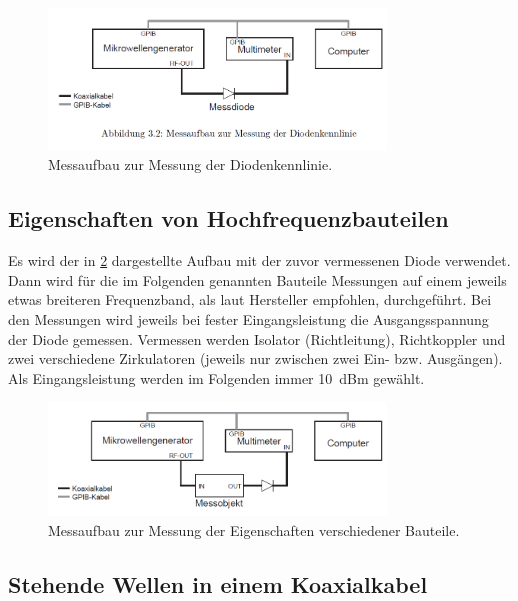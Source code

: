 \documentclass[
	a4paper,
	12pt,
	pagesize,
	ngerman
]{scrartcl}
\begin{document}
	\begin{figure}[H]
		\includegraphics[width=0.8\textwidth]{img/aufbau_kennlinie.png}
		\centering
		\caption{
		 	Messaufbau zur Messung der Diodenkennlinie. \cite{Anleitung}
		}
		\label{fig_aufbau_kennlinie}
		\centering
	\end{figure}

	\subsection{Eigenschaften von Hochfrequenzbauteilen}

	Es wird der in \cref{fig_aufbau_bauteile} dargestellte Aufbau mit der zuvor vermessenen Diode verwendet.
	Dann wird für die im Folgenden genannten Bauteile Messungen auf einem jeweils etwas breiteren Frequenzband, als laut Hersteller empfohlen, durchgeführt.
  Bei den Messungen wird jeweils bei fester Eingangsleistung die Ausgangsspannung der Diode gemessen.
	Vermessen werden Isolator (Richtleitung), Richtkoppler und zwei verschiedene Zirkulatoren (jeweils nur zwischen zwei Ein- bzw. Ausgängen).
	Als Eingangsleistung werden im Folgenden immer \SI{10}{dBm} gewählt.

	\begin{figure}[H]
		\includegraphics[width=0.8\textwidth]{img/aufbau_bauteile.png}
		\centering
		\caption{
		 	Messaufbau zur Messung der Eigenschaften verschiedener Bauteile. \cite{Anleitung}
		}
		\label{fig_aufbau_bauteile}
		\centering
	\end{figure}

	\subsection{Stehende Wellen in einem Koaxialkabel}
\end{document}
